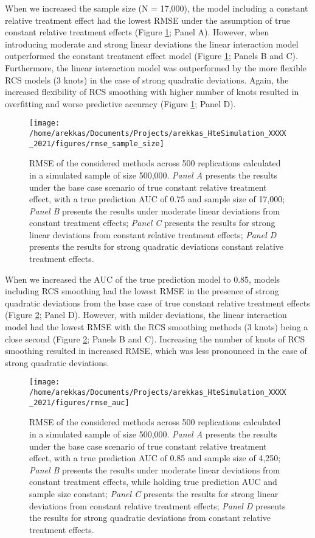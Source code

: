 \documentclass{article}
\begin{document}
When we increased the sample size (N = 17,000), the model including a
constant relative treatment effect had the lowest RMSE under the
assumption of true constant relative treatment effects (Figure
\ref{fig:rmsesamplesize}; Panel A). However, when introducing moderate
and strong linear deviations the linear interaction model outperformed
the constant treatment effect model (Figure \ref{fig:rmsesamplesize};
Panels B and C). Furthermore, the linear interaction model was
outperformed by the more flexible RCS models (3 knots) in the case of
strong quadratic deviations. Again, the increased flexibility of RCS
smoothing with higher number of knots resulted in overfitting and worse
predictive accuracy (Figure \ref{fig:rmsesamplesize}; Panel D).

\begin{figure}
\texttt{[image: /home/arekkas/Documents/Projects/arekkas\_HteSimulation\_XXXX\_2021/figures/rmse\_sample\_size]} \caption{RMSE of the considered methods across 500 replications calculated in a simulated sample of size 500,000. \textit{Panel A} presents the results under the base case scenario of true constant relative treatment effect, with a true prediction AUC of 0.75 and sample size of 17,000; \textit{Panel B} presents the results under moderate linear deviations from constant treatment effects; \textit{Panel C} presents the results for strong linear deviations from constant relative treatment effects; \textit{Panel D} presents the results for strong quadratic deviations constant relative treatment effects.}\label{fig:rmsesamplesize}
\end{figure}

When we increased the AUC of the true prediction model to 0.85, models
including RCS smoothing had the lowest RMSE in the presence of strong
quadratic deviations from the base case of true constant relative
treatment effects (Figure \ref{fig:rmseauc}; Panel D). However, with
milder deviations, the linear interaction model had the lowest RMSE with
the RCS smoothing methods (3 knots) being a close second (Figure
\ref{fig:rmseauc}; Panels B and C). Increasing the number of knots of
RCS smoothing resulted in increased RMSE, which was less pronounced in
the case of strong quadratic deviations.

\begin{figure}
\texttt{[image: /home/arekkas/Documents/Projects/arekkas\_HteSimulation\_XXXX\_2021/figures/rmse\_auc]} \caption{RMSE of the considered methods across 500 replications calculated in a simulated sample of size 500,000. \textit{Panel A} presents the results under the base case scenario of true constant relative treatment effect, with a true prediction AUC of 0.85 and sample size of 4,250; \textit{Panel B} presents the results under moderate linear deviations from constant treatment effects, while holding true prediction AUC and sample size constant; \textit{Panel C} presents the results for strong linear deviations from constant relative treatment effects; \textit{Panel D} presents the results for strong quadratic deviations from constant relative treatment effects.}\label{fig:rmseauc}
\end{figure}
\end{document}
